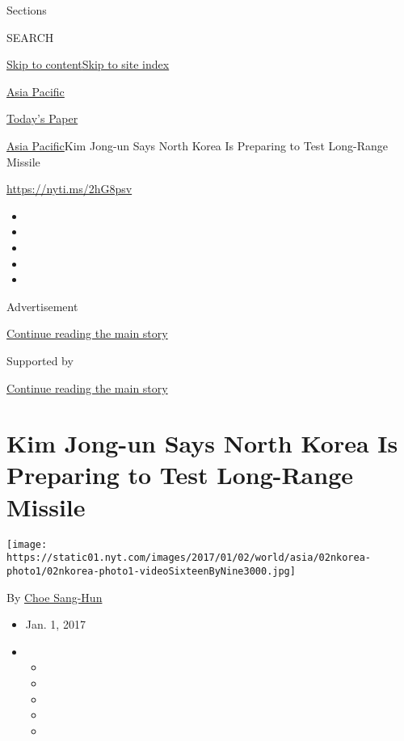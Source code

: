 Sections

SEARCH

\protect\hyperlink{site-content}{Skip to
content}\protect\hyperlink{site-index}{Skip to site index}

\href{https://www.nytimes.com/section/world/asia}{Asia Pacific}

\href{https://myaccount.nytimes.com/auth/login?response_type=cookie\&client_id=vi}{}

\href{https://www.nytimes.com/section/todayspaper}{Today's Paper}

\href{/section/world/asia}{Asia Pacific}\textbar{}Kim Jong-un Says North
Korea Is Preparing to Test Long-Range Missile

\url{https://nyti.ms/2hG8psv}

\begin{itemize}
\item
\item
\item
\item
\item
\end{itemize}

Advertisement

\protect\hyperlink{after-top}{Continue reading the main story}

Supported by

\protect\hyperlink{after-sponsor}{Continue reading the main story}

\hypertarget{kim-jong-un-says-north-korea-is-preparing-to-test-long-range-missile}{%
\section{Kim Jong-un Says North Korea Is Preparing to Test Long-Range
Missile}\label{kim-jong-un-says-north-korea-is-preparing-to-test-long-range-missile}}

\texttt{[image: https://static01.nyt.com/images/2017/01/02/world/asia/02nkorea-photo1/02nkorea-photo1-videoSixteenByNine3000.jpg]}

By \href{http://www.nytimes.com/by/choe-sang-hun}{Choe Sang-Hun}

\begin{itemize}
\item
  Jan. 1, 2017
\item
  \begin{itemize}
  \item
  \item
  \item
  \item
  \item
  \end{itemize}
\end{itemize}

